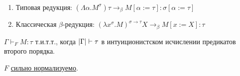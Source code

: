 \begin{definition} \ 
    \begin{enumerate}[label=(\asbuk*)]
        \item Типовая редукция: $\left(\Lambda \alpha . M^\sigma\right) \tau \rightarrow_\beta M[\alpha:=\tau] : \sigma[\alpha := \tau]$
        \item Классическая $\beta$-редукция: $\left(\lambda x^\sigma . M\right)^{\sigma \rightarrow \tau} X \rightarrow_\beta M [x:=X] : \tau$
    \end{enumerate}
\end{definition}

\begin{theorem}
    $\Gamma \vdash_F M :\tau$ т.и.т.т., когда $\left|\Gamma\right| \vdash \tau$ в интуиционистском исчислении предикатов второго порядка.
\end{theorem}

\begin{theorem}
    $F$ \hyperref[strong-normalization]{сильно нормализуемо}.
\end{theorem}

\todo 
